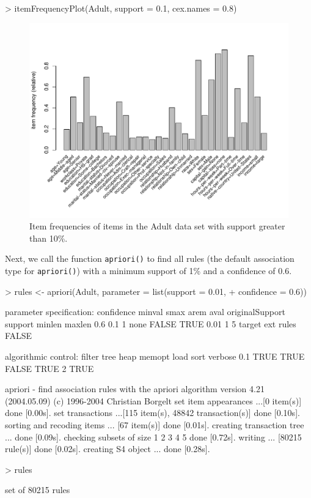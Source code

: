 \documentclass[10pt,a4paper]{article}
\newcommand{\func}[1]{\mbox{\texttt{#1()}}}
\begin{document}
\begin{Schunk}
\begin{Sinput}
> itemFrequencyPlot(Adult, support = 0.1, cex.names = 0.8)
\end{Sinput}
\end{Schunk}
\begin{figure}
\centering
\includegraphics{arules-019}
\caption{Item frequencies of items in the Adult data set with support greater than 10\%.}
\label{fig:itemFrequencyPlot}
\end{figure}

Next, we call the function
\func{apriori} to find all rules (the default association type for
\func{apriori}) with a minimum support of 1\% and a confidence of 0.6.

\begin{Schunk}
\begin{Sinput}
> rules <- apriori(Adult, parameter = list(support = 0.01, 
+     confidence = 0.6))
\end{Sinput}
\begin{Soutput}
parameter specification:
 confidence minval smax arem  aval originalSupport support minlen maxlen
        0.6    0.1    1 none FALSE            TRUE    0.01      1      5
 target   ext
  rules FALSE

algorithmic control:
 filter tree heap memopt load sort verbose
    0.1 TRUE TRUE  FALSE TRUE    2    TRUE

apriori - find association rules with the apriori algorithm
version 4.21 (2004.05.09)        (c) 1996-2004   Christian Borgelt
set item appearances ...[0 item(s)] done [0.00s].
set transactions ...[115 item(s), 48842 transaction(s)] done [0.10s].
sorting and recoding items ... [67 item(s)] done [0.01s].
creating transaction tree ... done [0.09s].
checking subsets of size 1 2 3 4 5 done [0.72s].
writing ... [80215 rule(s)] done [0.02s].
creating S4 object  ... done [0.28s].
\end{Soutput}
\begin{Sinput}
> rules
\end{Sinput}
\begin{Soutput}
set of 80215 rules 
\end{Soutput}
\end{Schunk}
\end{document}
